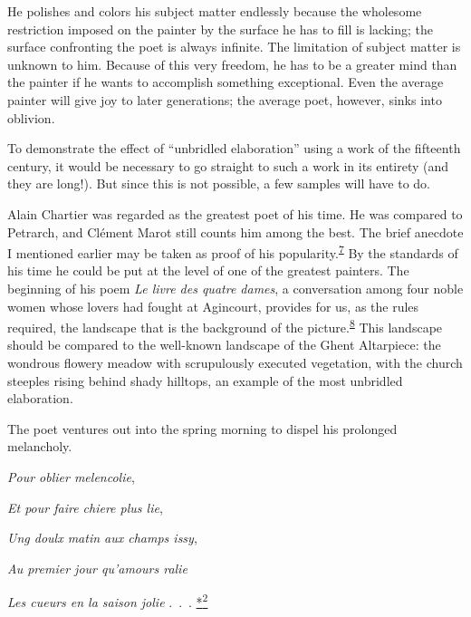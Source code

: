 He polishes and colors his subject matter endlessly because the
wholesome restriction imposed on the painter by the surface he has to
fill is lacking; the surface confronting the poet is always infinite.
The limitation of subject matter is unknown to him. Because of this very
freedom, he has to be a greater mind than the painter if he wants to
accomplish something exceptional. Even the average painter will give joy
to later generations; the average poet, however, sinks into oblivion.

To demonstrate the effect of ``unbridled elaboration'' using a work of
the fifteenth century, it would be necessary to go straight to such a
work in its entirety (and they are long!). But since this is not
possible, a few samples will have to do.

Alain Chartier was regarded as the greatest poet of his time. He was
compared to Petrarch, and Clément Marot still counts him among the best.
The brief anecdote I mentioned earlier may be taken as proof of his
popularity.\textsuperscript{\protect\hypertarget{21_Chapter_Thirteen__IMAGE_AND_WORD.xhtmlux5cux23id_295}{\protect\hyperlink{23_NOTES.xhtmlux5cux23id_296}{7}}}
By the standards of his time he could be put at the level of one of the
greatest painters. The
begin\protect\hypertarget{21_Chapter_Thirteen__IMAGE_AND_WORD.xhtmlux5cux23page_339}{}{}ning
of his poem \emph{Le livre des quatre dames}, a conversation among four
noble women whose lovers had fought at Agincourt, provides for us, as
the rules required, the landscape that is the background of the
picture.\textsuperscript{\protect\hypertarget{21_Chapter_Thirteen__IMAGE_AND_WORD.xhtmlux5cux23id_293}{\protect\hyperlink{23_NOTES.xhtmlux5cux23id_294}{8}}}
This landscape should be compared to the well-known landscape of the
Ghent Altarpiece: the wondrous flowery meadow with scrupulously executed
vegetation, with the church steeples rising behind shady hilltops, an
example of the most unbridled elaboration.

The poet ventures out into the spring morning to dispel his prolonged
melancholy.

\emph{Pour oblier melencolie},

\emph{Et pour faire chiere plus lie},

\emph{Ung doulx matin aux champs issy},

\emph{Au premier jour qu'amours ralie}

\emph{Les cueurs en la saison jolie} .~.~.
\protect\hypertarget{21_Chapter_Thirteen__IMAGE_AND_WORD.xhtmlux5cux23id_2707}{\protect\hyperlink{23_NOTES.xhtmlux5cux23id_2708}{*\textsuperscript{2}}}

